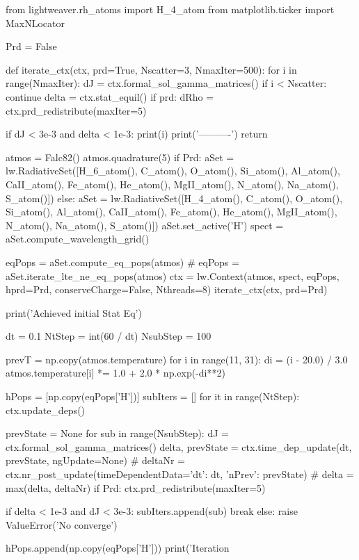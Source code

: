 \begin{pycode}[FlareModelling]
from lightweaver.rh_atoms import H_4_atom
from matplotlib.ticker import MaxNLocator

Prd = False

def iterate_ctx(ctx, prd=True, Nscatter=3, NmaxIter=500):
    for i in range(NmaxIter):
        dJ = ctx.formal_sol_gamma_matrices()
        if i < Nscatter:
            continue
        delta = ctx.stat_equil()
        if prd:
            dRho = ctx.prd_redistribute(maxIter=5)

        if dJ < 3e-3 and delta < 1e-3:
            print(i)
            print('----------')
            return

atmos = Falc82()
atmos.quadrature(5)
if Prd:
    aSet = lw.RadiativeSet([H_6_atom(), C_atom(), O_atom(), Si_atom(), Al_atom(), CaII_atom(), Fe_atom(), He_atom(), MgII_atom(), N_atom(), Na_atom(), S_atom()])
else:
    aSet = lw.RadiativeSet([H_4_atom(), C_atom(), O_atom(), Si_atom(), Al_atom(), CaII_atom(), Fe_atom(), He_atom(), MgII_atom(), N_atom(), Na_atom(), S_atom()])
aSet.set_active('H')
spect = aSet.compute_wavelength_grid()

eqPops = aSet.compute_eq_pops(atmos)
# eqPops = aSet.iterate_lte_ne_eq_pops(atmos)
ctx = lw.Context(atmos, spect, eqPops,
                 hprd=Prd, conserveCharge=False, Nthreads=8)
iterate_ctx(ctx, prd=Prd)

print('Achieved initial Stat Eq')

dt = 0.1
NtStep = int(60 / dt)
NsubStep = 100

prevT = np.copy(atmos.temperature)
for i in range(11, 31):
    di = (i - 20.0) / 3.0
    atmos.temperature[i] *= 1.0 + 2.0 * np.exp(-di**2)

hPops = [np.copy(eqPops['H'])]
subIters = []
for it in range(NtStep):
    ctx.update_deps()

    prevState = None
    for sub in range(NsubStep):
        dJ = ctx.formal_sol_gamma_matrices()
        delta, prevState = ctx.time_dep_update(dt, prevState, ngUpdate=None)
        # deltaNr = ctx.nr_post_update(timeDependentData={'dt': dt, 'nPrev': prevState})
        # delta = max(delta, deltaNr)
        if Prd:
            ctx.prd_redistribute(maxIter=5)

        if delta < 1e-3 and dJ < 3e-3:
            subIters.append(sub)
            break
    else:
        raise ValueError('No converge')

    hPops.append(np.copy(eqPops['H']))
    print('Iteration %



\end{pycode}
